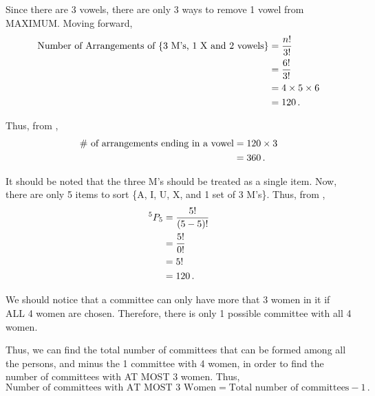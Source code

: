 \begin{subquestions}
\begin{subsubquestions}
Since there are 3 vowels, there are only 3 ways to remove 1 vowel from MAXIMUM. Moving forward,
\begin{align}
	\text{Number of Arrangements of \{3 M's, 1 X and 2 vowels\}} & = \frac{n!}{3!} \nonumber \\
																 & = \frac{6!}{3!} \nonumber \\
																 & = 4 \times 5 \times 6 \nonumber \\
																 & = 120 \,.
\end{align}
 
Thus, from ,
\begin{align}
	\text{$\#$ of arrangements ending in a vowel} & = 120 \times 3 \nonumber \\
	                                            & = 360 \,.
\end{align}


\subsubquestion

It should be noted that the three M's should be treated as a single item. Now, there are only 5 items to sort \{A, I, U, X, and 1 set of 3 M's\}. Thus, from ,
\begin{align}
	^{5}P_5 & = \frac{5!}{(5-5)!} \nonumber \\
	        & = \frac{5!}{0!} \nonumber \\
	        & = 5! \nonumber \\
	        & = 120 \,.
\end{align}

\end{subsubquestions}


\subquestion

We should notice that a committee can only have more that 3 women in it if ALL 4 women are chosen. Therefore, there is only 1 possible committee with all 4 women. 

Thus, we can find the total number of committees that can be formed among all the persons, and minus the 1 committee with 4 women, in order to find the number of committees with AT MOST 3 women. Thus,
\begin{equation}
  	\text{Number of committees with AT MOST 3 Women} = \text{Total number of committees} - 1 \,.
\end{equation}


\end{subquestions}
